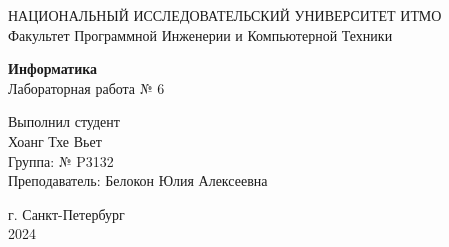 \pagestyle{fancy}  
\begin{center}
    \Large НАЦИОНАЛЬНЫЙ ИССЛЕДОВАТЕЛЬСКИЙ УНИВЕРСИТЕТ ИТМО \\
    \Large Факультет Программной Инженерии и Компьютерной Техники
\end{center}
\vspace{200pt}
\begin{center}
\textbf{Информатика} \\
\Large Лабораторная работа № 6 \\ 
\end{center}
\vspace{70pt}
\hspace*{0pt}\hfill Выполнил студент \\
\hspace*{0pt}\hfill Хоанг Тхе Вьет \\
\hspace*{0pt}\hfill Группа: № P3132 \\
\hspace*{0pt}\hfill Преподаватель: Белокон Юлия Алексеевна \\ 
\vspace{200pt}
\begin{center}
г. Санкт-Петербург \\
2024
\end{center}
